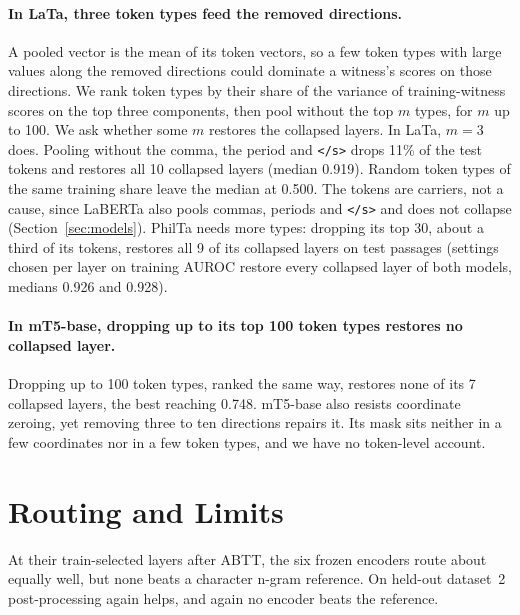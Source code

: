 \documentclass[11pt]{article}
\begin{document}
\paragraph{In LaTa, three token types feed the removed directions.}
A pooled vector is the mean of its token vectors, so a few token types with large values along the removed directions could dominate a witness's scores on those directions.
We rank token types by their share of the variance of training-witness scores on the top three components, then pool without the top $m$ types, for $m$ up to 100.
We ask whether some $m$ restores the collapsed layers.
In LaTa, $m=3$ does.
Pooling without the comma, the period and \texttt{</s>} drops 11\% of the test tokens and restores all 10 collapsed layers (median 0.919).
Random token types of the same training share leave the median at 0.500.
The tokens are carriers, not a cause, since LaBERTa also pools commas, periods and \texttt{</s>} and does not collapse (Section~\ref{sec:models}).
PhilTa needs more types: dropping its top 30, about a third of its tokens, restores all 9 of its collapsed layers on test passages (settings chosen per layer on training AUROC restore every collapsed layer of both models, medians 0.926 and 0.928).

\paragraph{In mT5-base, dropping up to its top 100 token types restores no collapsed layer.}
Dropping up to 100 token types, ranked the same way, restores none of its 7 collapsed layers, the best reaching 0.748.
mT5-base also resists coordinate zeroing, yet removing three to ten directions repairs it.
Its mask sits neither in a few coordinates nor in a few token types, and we have no token-level account.

\section{Routing and Limits}
\label{sec:routing}

At their train-selected layers after ABTT, the six frozen encoders route about equally well, but none beats a character n-gram reference.
On held-out dataset~2 post-processing again helps, and again no encoder beats the reference.
\end{document}
